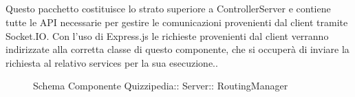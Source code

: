 \subsection{}
Questo pacchetto costituisce lo strato superiore a ControllerServer e contiene tutte le API necessarie per gestire le comunicazioni provenienti dal client tramite Socket.IO. 
Con l'uso di Express.js le richieste provenienti dal client verranno indirizzate alla corretta classe di questo componente, che si occuperà di inviare la richiesta al relativo services per la sua esecuzione..
\begin{figure}[H]
\centering
\noindent{}
\caption[Schema Componente RoutingManager]{Schema Componente Quizzipedia:: Server:: RoutingManager}
\end{figure}
